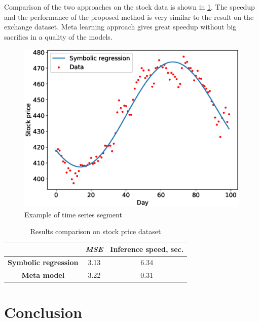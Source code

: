 \documentclass[12pt]{article}
\begin{document}
Comparison of the two approaches on the stock data is shown in \ref{table-stock}.
The speedup and the performance of the proposed method is very similar to the result on the exchange dataset.
Meta learning approach gives great speedup without big sacrifies in a quality of the models.
\newpage
\begin{figure}[!ht]
\centering
\includegraphics[scale=0.7]{stock.eps}
\caption{Example of time series segment}
\label{fig::stock}
\end{figure}

\begin{table}[!ht]
\centering
\caption{Results comparison on stock price dataset}
\label{table-stock}
\begin{tabular}{c|c|c|}
\cline{2-3}
                                                   & \textit{MSE} & Inference speed, sec. \\ \hline
\multicolumn{1}{|c|}{\textbf{Symbolic regression}} & 3.13        & 6.34                  \\ \hline
\multicolumn{1}{|c|}{\textbf{Meta model}}          & 3.22        & 0.31                  \\ \hline
\end{tabular}
\end{table}


\newpage

\section{Conclusion}

\newpage


\end{document}

